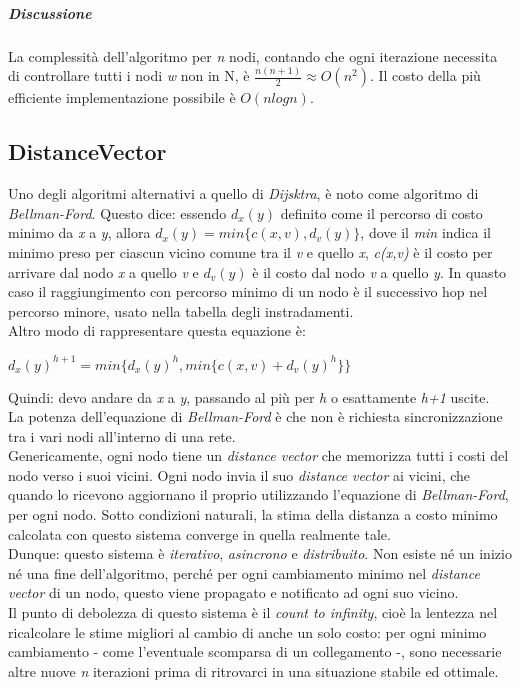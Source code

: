 \subparagraph{Discussione}
La complessità dell'algoritmo per \textit{n} nodi, contando che ogni iterazione necessita di controllare tutti i nodi \textit{w} non in N, è $ \frac{n(n+1)}{2} \approx O(n^2) $. Il costo della più efficiente implementazione possibile è $ O(nlogn) $.

\subsection{DistanceVector}
Uno degli algoritmi alternativi a quello di \textit{Dijsktra}, è noto come algoritmo di \textit{Bellman-Ford}. Questo dice: essendo $d_{x}(y)$ definito come il percorso di costo minimo da \textit{x} a \textit{y}, allora $d_{x}(y) = min\{c(x,v), d_{v}(y)\}$, dove il \textit{min} indica il minimo preso per ciascun vicino comune tra il \textit{v} e quello \textit{x}, \textit{c(x,v)} è il costo per arrivare dal nodo \textit{x} a quello \textit{v} e $d_{v}(y)$ è il costo dal nodo \textit{v} a quello \textit{y}. In quasto caso il raggiungimento con percorso minimo di un nodo è il successivo hop nel percorso minore, usato nella tabella degli instradamenti. \\
Altro modo di rappresentare questa equazione è:
\begin{center}
	$d_{x}(y)^{h+1} = min\{d_{x}(y)^h, min\{c(x,v) + d_{v}(y)^h\}\}$
\end{center}
Quindi: devo andare da \textit{x} a \textit{y}, passando al più per \textit{h} o esattamente \textit{h+1} uscite. \\
La potenza dell'equazione di \textit{Bellman-Ford} è che non è richiesta sincronizzazione tra i vari nodi all'interno di una rete. \\
Genericamente, ogni nodo tiene un \textit{distance vector} che memorizza tutti i costi del nodo verso i suoi vicini. Ogni nodo invia il suo \textit{distance vector} ai vicini, che quando lo ricevono aggiornano il proprio utilizzando l'equazione di \textit{Bellman-Ford}, per ogni nodo. Sotto condizioni naturali, la stima della distanza a costo minimo calcolata con questo sistema converge in quella realmente tale. \\
Dunque: questo sistema è \textit{iterativo}, \textit{asincrono} e \textit{distribuito}. Non esiste né un inizio né una fine dell'algoritmo, perché per ogni cambiamento minimo nel \textit{distance vector} di un nodo, questo viene propagato e notificato ad ogni suo vicino. \\
Il punto di debolezza di questo sistema è il \textit{count to infinity}, cioè la lentezza nel ricalcolare le stime migliori al cambio di anche un solo costo: per ogni minimo cambiamento - come l'eventuale scomparsa di un collegamento -, sono necessarie altre nuove \textit{n} iterazioni prima di ritrovarci in una situazione stabile ed ottimale.

